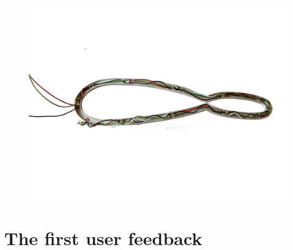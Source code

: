 \documentclass[a4paper,9pt]{article}
\begin{document}
    \hfill
    \begin{minipage}{0.48\linewidth}
    \begin{figure}[H]
   
         \centering
        \includegraphics[width=\linewidth]{Images/cable.png}        
        \label{cabel}

    \end{figure}
    \end{minipage}
    

\newpage


\section{The first user feedback }
\label{feedback}
\end{document}
